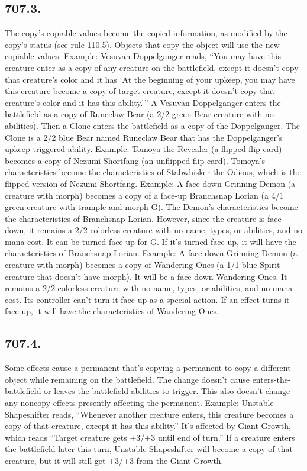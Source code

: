\subsection*{707.3.}
The copy’s copiable values become the copied information, as modified by the copy’s status (see rule 110.5). Objects that copy the object will use the new copiable values.
Example: Vesuvan Doppelganger reads, “You may have this creature enter as a copy of any creature on the battlefield, except it doesn’t copy that creature’s color and it has ‘At the beginning of your upkeep, you may have this creature become a copy of target creature, except it doesn’t copy that creature’s color and it has this ability.’” A Vesuvan Doppelganger enters the battlefield as a copy of Runeclaw Bear (a 2/2 green Bear creature with no abilities). Then a Clone enters the battlefield as a copy of the Doppelganger. The Clone is a 2/2 blue Bear named Runeclaw Bear that has the Doppelganger’s upkeep-triggered ability.
Example: Tomoya the Revealer (a flipped flip card) becomes a copy of Nezumi Shortfang (an unflipped flip card). Tomoya’s characteristics become the characteristics of Stabwhisker the Odious, which is the flipped version of Nezumi Shortfang.
Example: A face-down Grinning Demon (a creature with morph) becomes a copy of a face-up Branchsnap Lorian (a 4/1 green creature with trample and morph {G}). The Demon’s characteristics become the characteristics of Branchsnap Lorian. However, since the creature is face down, it remains a 2/2 colorless creature with no name, types, or abilities, and no mana cost. It can be turned face up for {G}. If it’s turned face up, it will have the characteristics of Branchsnap Lorian.
Example: A face-down Grinning Demon (a creature with morph) becomes a copy of Wandering Ones (a 1/1 blue Spirit creature that doesn’t have morph). It will be a face-down Wandering Ones. It remains a 2/2 colorless creature with no name, types, or abilities, and no mana cost. Its controller can’t turn it face up as a special action. If an effect turns it face up, it will have the characteristics of Wandering Ones.

\subsection*{707.4.}
Some effects cause a permanent that’s copying a permanent to copy a different object while remaining on the battlefield. The change doesn’t cause enters-the-battlefield or leaves-the-battlefield abilities to trigger. This also doesn’t change any noncopy effects presently affecting the permanent.
Example: Unstable Shapeshifter reads, “Whenever another creature enters, this creature becomes a copy of that creature, except it has this ability.” It’s affected by Giant Growth, which reads “Target creature gets +3/+3 until end of turn.” If a creature enters the battlefield later this turn, Unstable Shapeshifter will become a copy of that creature, but it will still get +3/+3 from the Giant Growth.

